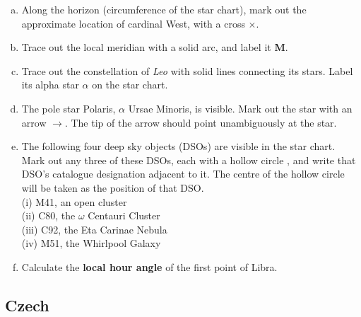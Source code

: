 \documentclass[a4paper,12pt]{extarticle}
\begin{document}
\begin{enumerate}[a.]
    \item Along the horizon (circumference of the star chart), mark out the approximate location of cardinal West, with a cross $\times$.
    \item Trace out the local meridian with a solid arc, and label it \textbf{M}. 
    \item  Trace out the constellation of \textit{Leo} with solid lines connecting its stars. Label its alpha star $\alpha$ on the star chart.
    \item  The pole star Polaris, $\alpha$ Ursae Minoris, is visible. Mark out the star with an arrow $\rightarrow$. The tip of the arrow should point unambiguously at the star.
    \item  The following four deep sky objects (DSOs) are visible in the star chart. Mark out any three of these DSOs, each with a hollow circle , and write that DSO’s catalogue designation adjacent to it. The centre of the hollow circle will be taken as the position of that DSO. \\
(i) M41, an open cluster\\
(ii) C80, the $\omega$ Centauri Cluster\\
(iii) C92, the Eta Carinae Nebula\\
(iv) M51, the Whirlpool Galaxy
    \item  Calculate the \textbf{local hour angle} of the first point of Libra. 
\end{enumerate}

\subsection{Czech}
\end{document}
